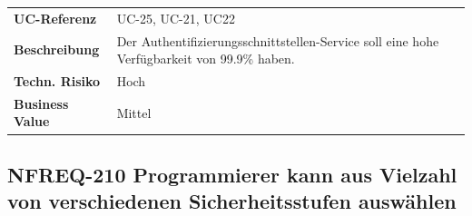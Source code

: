 \begin{longtable}[c]{@{}ll@{}}
\toprule
\begin{minipage}[t]{0.20\columnwidth}\raggedright\strut
\textbf{UC-Referenz}
\strut\end{minipage} &
\begin{minipage}[t]{0.74\columnwidth}\raggedright\strut
UC-25, UC-21, UC22
\strut\end{minipage}\tabularnewline
\begin{minipage}[t]{0.20\columnwidth}\raggedright\strut
\textbf{Beschreibung}
\strut\end{minipage} &
\begin{minipage}[t]{0.74\columnwidth}\raggedright\strut
Der Authentifizierungsschnittstellen-Service soll eine hohe
Verfügbarkeit von 99.9\% haben.
\strut\end{minipage}\tabularnewline
\begin{minipage}[t]{0.20\columnwidth}\raggedright\strut
\textbf{Techn. Risiko}
\strut\end{minipage} &
\begin{minipage}[t]{0.74\columnwidth}\raggedright\strut
Hoch
\strut\end{minipage}\tabularnewline
\begin{minipage}[t]{0.20\columnwidth}\raggedright\strut
\textbf{Business Value}
\strut\end{minipage} &
\begin{minipage}[t]{0.74\columnwidth}\raggedright\strut
Mittel
\strut\end{minipage}\tabularnewline
\bottomrule
\end{longtable}

\subsection{NFREQ-210 Programmierer kann aus Vielzahl von verschiedenen
Sicherheitsstufen
auswählen}\label{nfreq-210-programmierer-kann-aus-vielzahl-von-verschiedenen-sicherheitsstufen-auswuxe4hlen}

